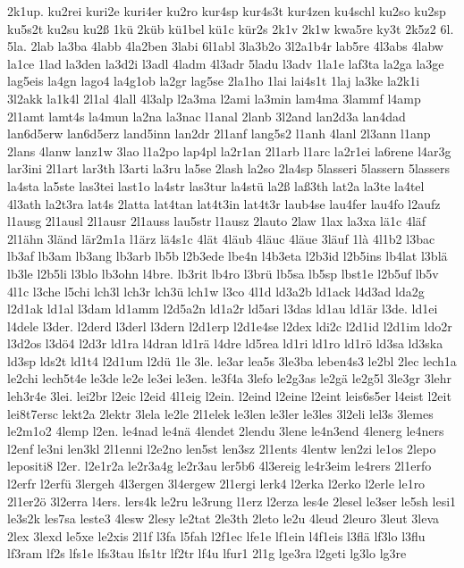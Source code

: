 {2k1up.
ku2rei
kuri2e
kuri4er
ku2ro
kur4sp
kur4s3t
kur4zen
ku4schl
ku2so
ku2sp
ku5s2t
ku2su
ku2ß
1kü
2küb
kü1bel
kü1c
kür2s
2k1v
2k1w
kwa5re
ky3t
2k5z2
6l.
5la.
2lab
la3ba
4labb
4la2ben
3labi
6l1abl
3la3b2o
3l2a1b4r
lab5re
4l3abs
4labw
la1ce
1lad
la3den
la3d2i
l3adl
4ladm
4l3adr
5ladu
l3adv
1la1e
laf3ta
la2ga
la3ge
lag5eis
la4gn
lago4
la4g1ob
la2gr
lag5se
2la1ho
1lai
lai4s1t
1laj
la3ke
la2k1i
3l2akk
la1k4l
2l1al
4lall
4l3alp
l2a3ma
l2ami
la3min
lam4ma
3lammf
l4amp
2l1amt
lamt4s
la4mun
la2na
la3nac
l1anal
2lanb
3l2and
lan2d3a
lan4dad
lan6d5erw
lan6d5erz
land5inn
lan2dr
2l1anf
lang5s2
l1anh
4lanl
2l3ann
l1anp
2lans
4lanw
lanz1w
3lao
l1a2po
lap4pl
la2r1an
2l1arb
l1arc
la2r1ei
la6rene
l4ar3g
lar3ini
2l1art
lar3th
l3arti
la3ru
la5se
2lash
la2so
2la4sp
5lasseri
5lassern
5lassers
la4sta
la5ste
las3tei
last1o
la4str
las3tur
la4stü
la2ß
laß3th
lat2a
la3te
la4tel
4l3ath
la2t3ra
lat4s
2latta
lat4tan
lat4t3in
lat4t3r
laub4se
lau4fer
lau4fo
l2aufz
l1ausg
2l1ausl
2l1ausr
2l1auss
lau5str
l1ausz
2lauto
2law
1lax
la3xa
lä1c
4läf
2l1ähn
3länd
lär2m1a
l1ärz
lä4s1c
4lät
4läub
4läuc
4läue
3läuf
1là
4l1b2
l3bac
lb3af
lb3am
lb3ang
lb3arb
lb5b
l2b3ede
lbe4n
l4b3eta
l2b3id
l2b5ins
lb4lat
l3blä
lb3le
l2b5li
l3blo
lb3ohn
l4bre.
lb3rit
lb4ro
l3brü
lb5sa
lb5sp
lbst1e
l2b5uf
lb5v
4l1c
l3che
l5chi
lch3l
lch3r
lch3ü
lch1w
l3co
4l1d
ld3a2b
ld1ack
l4d3ad
lda2g
l2d1ak
ld1al
l3dam
ld1amm
l2d5a2n
ld1a2r
ld5ari
l3das
ld1au
ld1är
l3de.
ld1ei
l4dele
l3der.
l2derd
l3derl
l3dern
l2d1erp
l2d1e4se
l2dex
ldi2c
l2d1id
l2d1im
ldo2r
l3d2os
l3dö4
l2d3r
ld1ra
l4dran
ld1rä
l4dre
ld5rea
ld1ri
ld1ro
ld1rö
ld3sa
ld3ska
ld3sp
lds2t
ld1t4
l2d1um
l2dü
1le
3le.
le3ar
lea5s
3le3ba
leben4s3
le2bl
2lec
lech1a
le2chi
lech5t4e
le3de
le2e
le3ei
le3en.
le3f4a
3lefo
le2g3as
le2gä
le2g5l
3le3gr
3lehr
leh3r4e
3lei.
lei2br
l2eic
l2eid
4l1eig
l2ein.
l2eind
l2eine
l2eint
leis6s5er
l4eist
l2eit
lei8t7ersc
lekt2a
2lektr
3lela
le2le
2l1elek
le3len
le3ler
le3les
3l2eli
lel3s
3lemes
le2m1o2
4lemp
l2en.
le4nad
le4nä
4lendet
2lendu
3lene
le4n3end
4lenerg
le4ners
l2enf
le3ni
len3kl
2l1enni
l2e2no
len5st
len3sz
2l1ents
4lentw
len2zi
le1os
2lepo
lepositi8
l2er.
l2e1r2a
le2r3a4g
le2r3au
ler5b6
4l3ereig
le4r3eim
le4rers
2l1erfo
l2erfr
l2erfü
3lergeh
4l3ergen
3l4ergew
2l1ergi
lerk4
l2erka
l2erko
l2erle
le1ro
2l1er2ö
3l2erra
l4ers.
lers4k
le2ru
le3rung
l1erz
l2erza
les4e
2lesel
le3ser
le5sh
lesi1
le3s2k
les7sa
leste3
4lesw
2lesy
le2tat
2le3th
2leto
le2u
4leud
2leuro
3leut
3leva
2lex
3lexd
le5xe
le2xis
2l1f
l3fa
l5fah
l2f1ec
lfe1e
lf1ein
l4f1eis
l3flä
lf3lo
l3flu
lf3ram
lf2s
lfs1e
lfs3tau
lfs1tr
lf2tr
lf4u
lfur1
2l1g
lge3ra
l2geti
lg3lo
lg3re
}
